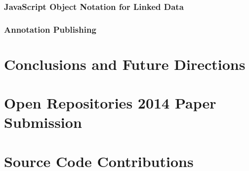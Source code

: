 \documentclass[12pt,a4paper,twoside]{report}
\begin{document}
      \subsubsection{JavaScript Object Notation for Linked Data}
        \label{sec:json}
        

      \subsubsection{Annotation Publishing}
        \label{sec:pub}
        

  \clearpage

  \section{Conclusions and Future Directions}
    \label{sec:outro}
    

  
  

  \appendixpage
  \addappheadtotoc

  \appendix
    \section{Open Repositories 2014 Paper Submission}
      \label{apx:or2014}
      

    \section{Source Code Contributions}
      \label{apx:code}
      
\end{document}
